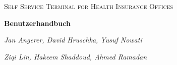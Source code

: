 \documentclass[12, A4]{article}
\begin{document}
\begin{titlepage} %
\centering

	{\scshape\LARGE Self Service Terminal for Health Insurance Offices\par}
	\vspace{5cm}

	{\huge\bfseries Benutzerhandbuch\par}
	\vspace{4.5cm}
	{\Large\itshape Jan Angerer, David Hruschka, Yusuf Nowati \par}
	\vspace{0.5cm}
	{\Large\itshape Ziqi Lin, Hakeem Shaddoud, Ahmed Ramadan \par}
	\vfill


	\vfill

\end{titlepage} %


\newpage

\newpage
\tableofcontents  %
\newpage

\newpage

\newpage

\newpage

\end{document}
